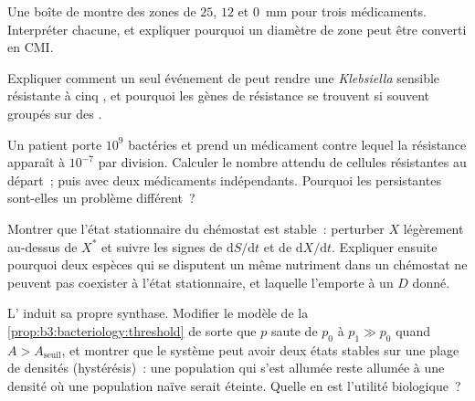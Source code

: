 \begin{exercise}[$\star\star$]\label{exo:b3:bacteriology:7}
Une boîte de  montre des zones de $25$, $12$ et
\qty{0}{mm} pour trois médicaments. Interpréter chacune, et expliquer
pourquoi un diamètre de zone peut être converti en CMI.
\end{exercise}

\begin{exercise}[$\star\star$]\label{exo:b3:bacteriology:8}
Expliquer comment un seul événement de  peut rendre une
\emph{Klebsiella} sensible résistante à cinq , et pourquoi
les gènes de résistance se trouvent si souvent groupés sur des
.
\end{exercise}

\begin{exercise}[$\star\star$]\label{exo:b3:bacteriology:9}
Un patient porte $10^{9}$ bactéries et prend un médicament contre
lequel la résistance apparaît à $10^{-7}$ par division. Calculer le
nombre attendu de cellules résistantes au départ~; puis avec deux
médicaments indépendants. Pourquoi les persistantes sont-elles un
problème différent~?
\end{exercise}

\begin{exercise}[$\star\star\star$]\label{exo:b3:bacteriology:10}
Montrer que l'état stationnaire du chémostat est stable~: perturber $X$
légèrement au-dessus de $X^{*}$ et suivre les signes de
$\mathrm{d}S/\mathrm{d}t$ et de $\mathrm{d}X/\mathrm{d}t$. Expliquer
ensuite pourquoi deux espèces qui se disputent un même nutriment dans
un chémostat ne peuvent pas coexister à l'état stationnaire, et
laquelle l'emporte à un $D$ donné.
\end{exercise}

\begin{exercise}[$\star\star\star$]\label{exo:b3:bacteriology:11}
L' induit sa propre synthase. Modifier le modèle de la
\cref{prop:b3:bacteriology:threshold} de sorte que $p$ saute de $p_{0}$
à $p_{1} \gg p_{0}$ quand $A > A_{\text{seuil}}$, et montrer que le
système peut avoir deux états stables sur une plage de densités
(hystérésis)~: une population qui s'est allumée reste allumée à une
densité où une population naïve serait éteinte. Quelle en est l'utilité
biologique~?
\end{exercise}


